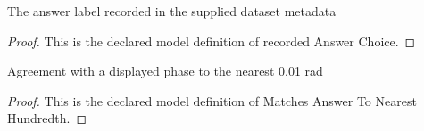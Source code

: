 \begin{definition}
  \label{def:physics:phyx-mini-0254:phyxminiproblems-problemphyxmini0254-recordedanswerchoice}
  The answer label recorded in the supplied dataset metadata
\end{definition}
\begin{proof}
  This is the declared model definition of recorded Answer Choice.
\end{proof}
\begin{definition}
  \label{def:physics:phyx-mini-0254:phyxminiproblems-problemphyxmini0254-matchesanswertonearesthundredth}
  Agreement with a displayed phase to the nearest 0.01 rad
\end{definition}
\begin{proof}
  This is the declared model definition of Matches Answer To Nearest Hundredth.
\end{proof}
